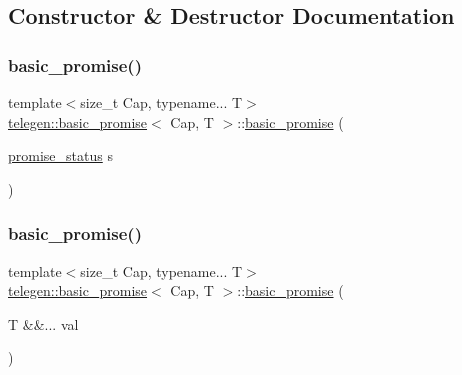 \subsection{Constructor \& Destructor Documentation}
\mbox{\label{classtelegen_1_1basic__promise_a2fc82b832b36b925b1c1fd42dd37cf40}} 
\subsubsection{\texorpdfstring{basic\+\_\+promise()}{basic\_promise()}\hspace{0.1cm}{\footnotesize\ttfamily [1/5]}}
{\footnotesize\ttfamily template$<$size\+\_\+t Cap, typename... T$>$ \\
\hyperlink{classtelegen_1_1basic__promise}{telegen\+::basic\+\_\+promise}$<$ Cap, T $>$\+::\hyperlink{classtelegen_1_1basic__promise}{basic\+\_\+promise} (\begin{DoxyParamCaption}\item[{\hyperlink{namespacetelegen_a51e8b7480c7247182e2c6ca35e2c7504}{promise\+\_\+status}}]{s }\end{DoxyParamCaption})\hspace{0.3cm}{\ttfamily [inline]}}

\mbox{\label{classtelegen_1_1basic__promise_a836472488ebd1d41cf9070420903848c}} 
\subsubsection{\texorpdfstring{basic\+\_\+promise()}{basic\_promise()}\hspace{0.1cm}{\footnotesize\ttfamily [2/5]}}
{\footnotesize\ttfamily template$<$size\+\_\+t Cap, typename... T$>$ \\
\hyperlink{classtelegen_1_1basic__promise}{telegen\+::basic\+\_\+promise}$<$ Cap, T $>$\+::\hyperlink{classtelegen_1_1basic__promise}{basic\+\_\+promise} (\begin{DoxyParamCaption}\item[{T \&\&...}]{val }\end{DoxyParamCaption})\hspace{0.3cm}{\ttfamily [inline]}}

